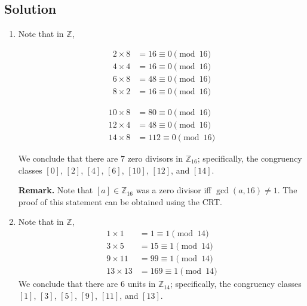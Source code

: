 \documentclass{article}
\begin{document}
\subsection*{Solution}
    \begin{enumerate}
        \item Note that in $\mathbb{Z}$,
        
        \vspace{-8mm}
        \begin{center}
        \begin{minipage}[t]{0.4\textwidth}
            \begin{align*}
                2 \times 8 &= 16 \equiv 0 \pmod{16} \\
                4 \times 4 &= 16 \equiv 0 \pmod{16} \\
                6 \times 8 &= 48 \equiv 0 \pmod{16} \\
                8 \times 2 &= 16 \equiv 0 \pmod{16}
            \end{align*}
        \end{minipage}
        \begin{minipage}[t]{0.4\textwidth}
        \begin{align*}
            10 \times 8 &= 80 \equiv 0 \pmod{16} \\
            12 \times 4 &= 48 \equiv 0 \pmod{16} \\
            14 \times 8 &= 112 \equiv 0 \pmod{16} 
        \end{align*}
        \end{minipage}
        \end{center}
        We conclude that there are $7$ zero divisors in $\mathbb{Z}_{16}$; specifically, the congruency classes $[0]$, $[2]$, $[4]$, $[6]$, $[10]$, $[12]$, and $[14]$.
        
        \vspace{1mm}
        \textbf{Remark.} Note that $[a] \in \mathbb{Z}_{16}$ was a zero divisor iff $\gcd(a, 16) \ne 1$. The proof of this statement can be obtained using the CRT.
        \item Note that in $\mathbb{Z}$,
        \begin{align*}
            1 \times 1 &= 1 \equiv 1 \pmod{14} \\
            3 \times 5 &= 15 \equiv 1 \pmod{14} \\
            9 \times 11 &= 99 \equiv 1 \pmod{14} \\
            13 \times 13 &= 169 \equiv 1 \pmod{14}
        \end{align*}
        We conclude that there are $6$ units in $\mathbb{Z}_{14}$; specifically, the congruency classes $[1]$, $[3]$, $[5]$, $[9]$, $[11]$, and $[13]$.
        

\end{enumerate}
\end{document}
